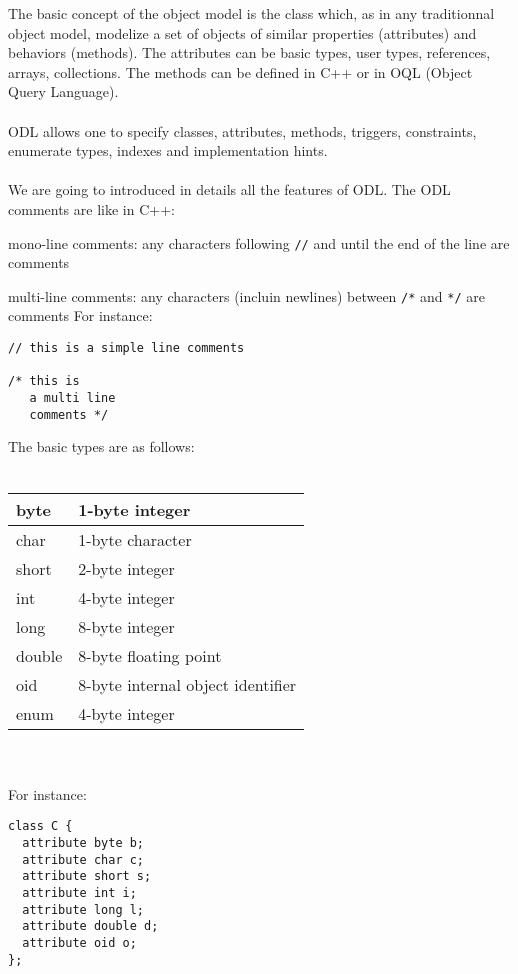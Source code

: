 
The basic concept of the \eyedb object model is the class which, as in any
traditionnal object model, modelize a set
of objects of similar properties (attributes) and behaviors (methods).
The attributes can be basic types, user types, references, arrays, collections.
The methods can be defined in C++ or in OQL (Object Query Language).
\\
\\
ODL allows one to specify classes, attributes, methods, triggers, constraints,
enumerate types, indexes and implementation hints.
\\
\\
We are going to introduced in details all the features of ODL.
The ODL comments are like in C++:
\bi
\item mono-line comments: any characters following \texttt{//} and until
the end of the line are comments
\item multi-line comments: any characters (incluin newlines) between \texttt{/*} and \texttt{*/}
are comments
\ei
For instance:
\vspace{-2mm}
\begin{verbatim}
// this is a simple line comments

/* this is
   a multi line
   comments */
\end{verbatim}
The basic types are as follows:\\\\
\begin{tabular}{|p{2cm}|p{5cm}|}
\hline
byte & 1-byte integer \\
\hline
char & 1-byte character \\
\hline
short & 2-byte integer \\
\hline
int & 4-byte integer \\
\hline
long & 8-byte integer \\
\hline
double & 8-byte floating point \\
\hline
oid & 8-byte internal object identifier \\
\hline
enum & 4-byte integer \\
\hline
\end{tabular}
\\
\\
For instance:
\vspace{-0.2cm}
\begin{verbatim}
class C {
  attribute byte b;
  attribute char c;
  attribute short s;
  attribute int i;
  attribute long l;
  attribute double d;
  attribute oid o;
};
\end{verbatim}
